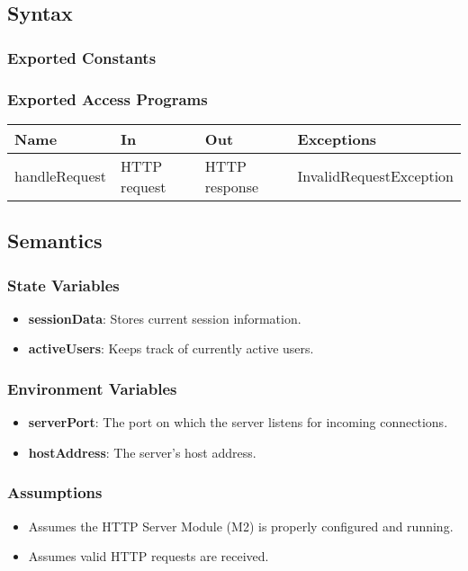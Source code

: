 \documentclass[12pt, titlepage]{article}
\begin{document}
\subsection{Syntax}
\subsubsection{Exported Constants}

\subsubsection{Exported Access Programs}

\begin{center}
\begin{tabular}{p{2.5cm} p{3.5cm} p{3.5cm} p{3cm}}
\hline
\textbf{Name} & \textbf{In} & \textbf{Out} & \textbf{Exceptions} \\
\hline
handleRequest & HTTP request & HTTP response & InvalidRequestException \\
\hline
\end{tabular}
\end{center}
\subsection{Semantics}
\subsubsection{State Variables}
\begin{itemize}
  \item \textbf{sessionData}: Stores current session information.
  \item \textbf{activeUsers}: Keeps track of currently active users.
\end{itemize}
\subsubsection{Environment Variables}
\begin{itemize}
  \item \textbf{serverPort}: The port on which the server listens for incoming connections.
  \item \textbf{hostAddress}: The server's host address.
\end{itemize}
\subsubsection{Assumptions}
\begin{itemize}
  \item Assumes the HTTP Server Module (M2) is properly configured and running.
  \item Assumes valid HTTP requests are received.
\end{itemize}
\end{document}
